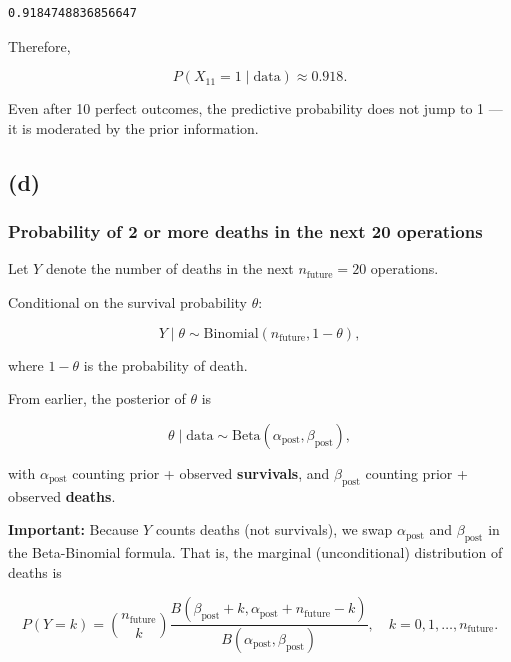 \documentclass[
  letterpaper,
  DIV=11,
  numbers=noendperiod]{scrartcl}
\begin{document}
\begin{verbatim}
0.9184748836856647
\end{verbatim}

Therefore,

\[
\boxed{
P(X_{11}=1 \mid \text{data}) \approx 0.918.
}
\]

Even after 10 perfect outcomes, the predictive probability does not jump
to 1 --- it is moderated by the prior information.

\subsection{(d)}\label{d}

\subsubsection{Probability of 2 or more deaths in the next 20
operations}\label{probability-of-2-or-more-deaths-in-the-next-20-operations}

Let \(Y\) denote the number of deaths in the next \(n_\text{future}=20\)
operations.

Conditional on the survival probability \(\theta\):

\[
Y \mid \theta \sim \text{Binomial}(n_\text{future}, 1-\theta),
\]

where \(1-\theta\) is the probability of death.

From earlier, the posterior of \(\theta\) is

\[
\theta \mid \text{data} \sim \text{Beta}(\alpha_\text{post}, \beta_\text{post}),
\]

with \(\alpha_\text{post}\) counting prior + observed
\textbf{survivals}, and \(\beta_\text{post}\) counting prior + observed
\textbf{deaths}.

\textbf{Important:} Because \(Y\) counts deaths (not survivals), we swap
\(\alpha_\text{post}\) and \(\beta_\text{post}\) in the Beta-Binomial
formula. That is, the marginal (unconditional) distribution of deaths is

\[
P(Y=k) = \binom{n_\text{future}}{k} \frac{B(\beta_\text{post} + k, \alpha_\text{post} + n_\text{future} - k)}{B(\alpha_\text{post}, \beta_\text{post})}, 
\quad k = 0,1,\dots,n_\text{future}.
\]
\end{document}
